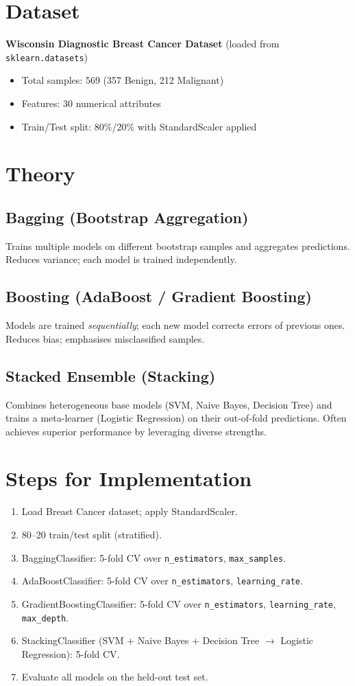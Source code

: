 \documentclass[11pt]{article}
\begin{document}
\section*{Dataset}
\textbf{Wisconsin Diagnostic Breast Cancer Dataset} (loaded from \texttt{sklearn.datasets})
\begin{itemize}
    \item Total samples: 569 (357 Benign, 212 Malignant)
    \item Features: 30 numerical attributes
    \item Train/Test split: 80\%/20\% with StandardScaler applied
\end{itemize}

\section*{Theory}

\subsection*{Bagging (Bootstrap Aggregation)}
Trains multiple models on different bootstrap samples and aggregates predictions. Reduces variance; each model is trained independently.

\subsection*{Boosting (AdaBoost / Gradient Boosting)}
Models are trained \emph{sequentially}; each new model corrects errors of previous ones. Reduces bias; emphasises misclassified samples.

\subsection*{Stacked Ensemble (Stacking)}
Combines heterogeneous base models (SVM, Naive Bayes, Decision Tree) and trains a meta-learner (Logistic Regression) on their out-of-fold predictions. Often achieves superior performance by leveraging diverse strengths.

\section*{Steps for Implementation}
\begin{enumerate}[label=\arabic*.]
    \item Load Breast Cancer dataset; apply StandardScaler.
    \item 80--20 train/test split (stratified).
    \item BaggingClassifier: 5-fold CV over \texttt{n\_estimators}, \texttt{max\_samples}.
    \item AdaBoostClassifier: 5-fold CV over \texttt{n\_estimators}, \texttt{learning\_rate}.
    \item GradientBoostingClassifier: 5-fold CV over \texttt{n\_estimators}, \texttt{learning\_rate}, \texttt{max\_depth}.
    \item StackingClassifier (SVM + Naive Bayes + Decision Tree $\to$ Logistic Regression): 5-fold CV.
    \item Evaluate all models on the held-out test set.
\end{enumerate}
\end{document}
